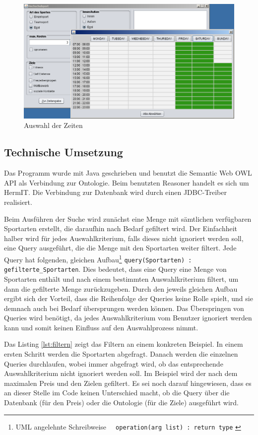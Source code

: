 \begin{figure}[p]
\centering
\includegraphics[width=\textwidth]{images/guizeit.png}%
\caption{Auswahl der Zeiten}
\label{fig:Auswahl der Zeiten}
\end{figure}
\newpage
\subsection{Technische Umsetzung}
Das Programm wurde mit Java geschrieben und benutzt die Semantic Web OWL API \autocite{semweb:owlapi} als Verbindung zur Ontologie. Beim benutzten Reasoner handelt es sich um HermIT\autocite{krr:hermit}. Die Verbindung zur Datenbank wird durch einen JDBC-Treiber\autocite{oracle:jdbc} realisiert.

Beim Ausf\"uhren der Suche wird zun\"achst eine Menge mit s\"amtlichen verf\"ugbaren Sportarten erstellt, die daraufhin nach Bedarf gefiltert wird. Der Einfachheit halber wird f\"ur jedes Auswahlkriterium, falls dieses nicht ignoriert werden soll, eine Query ausgef\"uhrt, die die Menge mit den Sportarten weiter filtert. Jede Query hat folgenden, gleichen Aufbau\footnote{UML angelehnte Schreibweise \lstinline"  operation(arg list) : return type" \autocite{kow:umlclass}} \lstinline"query(Sportarten) : gefilterte_Sportarten". Dies bedeutet, dass eine Query eine Menge von Sportarten enth\"alt und nach einem bestimmten Auswahlkriterium filtert, um dann die gefilterte Menge zur\"uckzugeben. Durch den jeweils gleichen Aufbau ergibt sich der Vorteil, dass die Reihenfolge der Queries keine Rolle spielt, und sie demnach auch bei Bedarf \"ubersprungen werden k\"onnen. Das \"Uberspringen von Queries wird ben\"otigt, da jedes Auswahlkriterium vom Benutzer ignoriert werden kann und somit keinen Einfluss auf den Auswahlprozess nimmt.

Das Listing \ref{lst:filtern} zeigt das Filtern an einem konkreten Beispiel. In einem ersten Schritt werden die Sportarten abgefragt. Danach werden die einzelnen Queries durchlaufen, wobei immer abgefragt wird, ob das entsprechende Auswahlkriterium nicht ignoriert werden soll. Im Beispiel wird der nach dem maximalen Preis und den Zielen gefiltert. Es sei noch darauf hingewiesen, dass es an dieser Stelle im Code keinen Unterschied macht, ob die Query \"uber die Datenbank (f\"ur den Preis) oder die Ontologie (f\"ur die Ziele) ausgef\"uhrt wird. 

